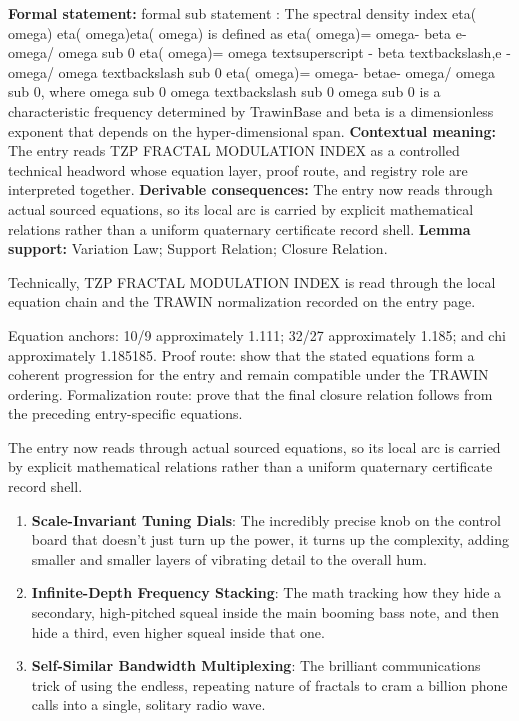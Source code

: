\begingroup\footnotesize\setlength{\emergencystretch}{3em}\sloppy
\textbf{Formal statement:} formal sub statement : The spectral density index eta( omega) eta( omega)eta( omega) is defined as eta( omega)= omega- beta e- omega/ omega sub 0 eta( omega)= omega textsuperscript - beta textbackslash,e - omega/ omega textbackslash sub 0 eta( omega)= omega- betae- omega/ omega sub 0, where omega sub 0 omega textbackslash sub 0 omega sub 0 is a characteristic frequency determined by TrawinBase and beta is a dimensionless exponent that depends on the hyper-dimensional span. \textbf{Contextual meaning:} The entry reads TZP FRACTAL MODULATION INDEX as a controlled technical headword whose equation layer, proof route, and registry role are interpreted together. \textbf{Derivable consequences:} The entry now reads through actual sourced equations, so its local arc is carried by explicit mathematical relations rather than a uniform quaternary certificate record shell. \textbf{Lemma support:} Variation Law; Support Relation; Closure Relation.\par
\endgroup

Technically, TZP FRACTAL MODULATION INDEX is read through the local equation chain and the TRAWIN normalization recorded on the entry page.

Equation anchors: 10/9 approximately 1.111; 32/27 approximately 1.185; and chi approximately 1.185185. Proof route: show that the stated equations form a coherent progression for the entry and remain compatible under the TRAWIN ordering. Formalization route: prove that the final closure relation follows from the preceding entry-specific equations.

The entry now reads through actual sourced equations, so its local arc is carried by explicit mathematical relations rather than a uniform quaternary certificate record shell.
\endgroup

\begin{enumerate}[leftmargin=1.6em,itemsep=6pt,topsep=4pt]
\item \textbf{Scale-Invariant Tuning Dials}: The incredibly precise knob on the control board that doesn't just turn up the power, it turns up the complexity, adding smaller and smaller layers of vibrating detail to the overall hum.
\item \textbf{Infinite-Depth Frequency Stacking}: The math tracking how they hide a secondary, high-pitched squeal inside the main booming bass note, and then hide a third, even higher squeal inside that one.
\item \textbf{Self-Similar Bandwidth Multiplexing}: The brilliant communications trick of using the endless, repeating nature of fractals to cram a billion phone calls into a single, solitary radio wave.
\end{enumerate}


